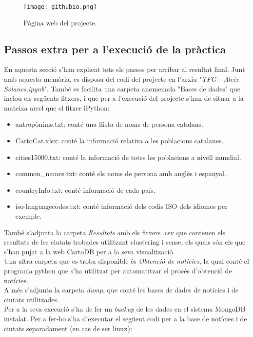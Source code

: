 \documentclass[12pt,a4paper,openright,oneside]{article}
\numberwithin{equation}{section}
\theoremstyle{definition}
\begin{document}
\begin{figure}[!htbp]
\centering
\texttt{[image: githubio.png]}
\caption{Pàgina web del projecte.}
\end{figure}

\subsection{Passos extra per a l'execució de la pràctica}
En aquesta secció s'han explicat tots els passos per arribar al resultat final. Junt amb aquesta memòria, es disposa del codi del projecte en l'arxiu "\emph{TFG - Aleix Solanes.ipynb}". També es facilita una carpeta anomenada "Bases de dades" que inclou els següents fitxers, i que per a l'execució del projecte s'han de situar a la mateixa arrel que el fitxer iPython:
\begin{itemize}
\item antropònims.txt: conté una llista de noms de persona catalans.
\item CartoCat.xlsx: conté la informació relativa a les poblacions catalanes.
\item cities15000.txt: conté la informació de totes les poblacions a nivell mundial.
\item common\_names.txt: conté els noms de persona amb anglès i espanyol.
\item countryInfo.txt: conté informació de cada país.
\item iso-languagecodes.txt: conté informació dels codis ISO dels idiomes per exemple.
\end{itemize}
També s'adjunta la carpeta \emph{Resultats} amb els fitxers .csv que contenen els resultats de les ciutats trobades utilitzant clustering i sense, els quals són els que s'han pujat a la web CartoDB per a la seva visualització.\\
Una altra carpeta que es troba disponible és \emph{Obtenció de notícies}, la qual conté el programa python que s'ha utilitzat per automatitzar el procés d'obtenció de notícies.\\
A més s'adjunta la carpeta \emph{dump}, que conté les bases de dades de notícies i de ciutats utilitzades.\\
Per a la seva execució s'ha de fer un \emph{backup} de les dades en el sistema MongoDB instalat. Per a fer-ho s'ha d'executar el següent codi per a la base de notícies i de ciutats separadament (en cas de ser linux):
\end{document}
